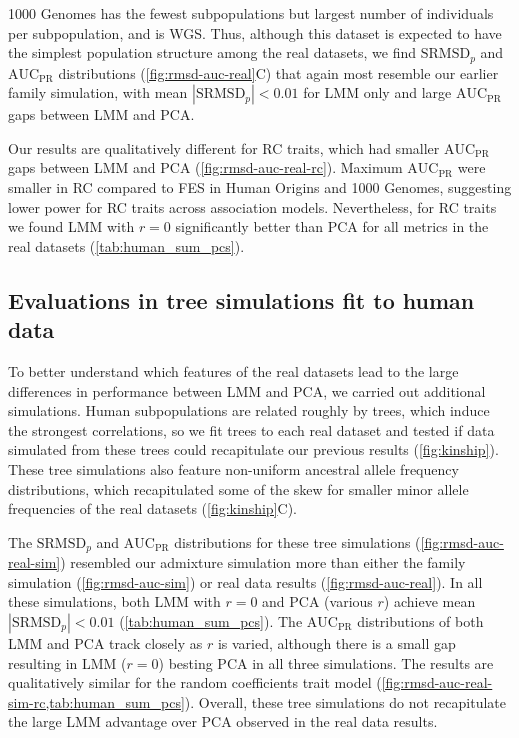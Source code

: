 \documentclass[11pt]{article}
\newcommand{\rmsd}{\text{SRMSD}_p}
\newcommand{\auc}{\text{AUC}_\text{PR}}
\begin{document}
1000 Genomes has the fewest subpopulations but largest number of individuals per subpopulation, and is WGS.
Thus, although this dataset is expected to have the simplest population structure among the real datasets, we find $\rmsd$ and $\auc$ distributions (\cref{fig:rmsd-auc-real}C) that again most resemble our earlier family simulation, with mean $|\rmsd| < 0.01$ for LMM only and large $\auc$ gaps between LMM and PCA.

Our results are qualitatively different for RC traits, which had smaller $\auc$ gaps between LMM and PCA (\cref{fig:rmsd-auc-real-rc}).
Maximum $\auc$ were smaller in RC compared to FES in Human Origins and 1000 Genomes, suggesting lower power for RC traits across association models.
Nevertheless, for RC traits we found LMM with $r=0$ significantly better than PCA for all metrics in the real datasets (\cref{tab:human_sum_pcs}).

\subsection{Evaluations in tree simulations fit to human data}

To better understand which features of the real datasets lead to the large differences in performance between LMM and PCA, we carried out additional simulations.
Human subpopulations are related roughly by trees, which induce the strongest correlations, so we fit trees to each real dataset and tested if data simulated from these trees could recapitulate our previous results (\cref{fig:kinship}).
These tree simulations also feature non-uniform ancestral allele frequency distributions, which recapitulated some of the skew for smaller minor allele frequencies of the real datasets (\cref{fig:kinship}C).

The $\rmsd$ and $\auc$ distributions for these tree simulations (\cref{fig:rmsd-auc-real-sim}) resembled our admixture simulation more than either the family simulation (\cref{fig:rmsd-auc-sim}) or real data results (\cref{fig:rmsd-auc-real}).
In all these simulations, both LMM with $r=0$ and PCA (various $r$) achieve mean $|\rmsd| < 0.01$ (\cref{tab:human_sum_pcs}).
The $\auc$ distributions of both LMM and PCA track closely as $r$ is varied, although there is a small gap resulting in LMM ($r=0$) besting PCA in all three simulations.
The results are qualitatively similar for the random coefficients trait model (\cref{fig:rmsd-auc-real-sim-rc,tab:human_sum_pcs}).
Overall, these tree simulations do not recapitulate the large LMM advantage over PCA observed in the real data results.
\end{document}
